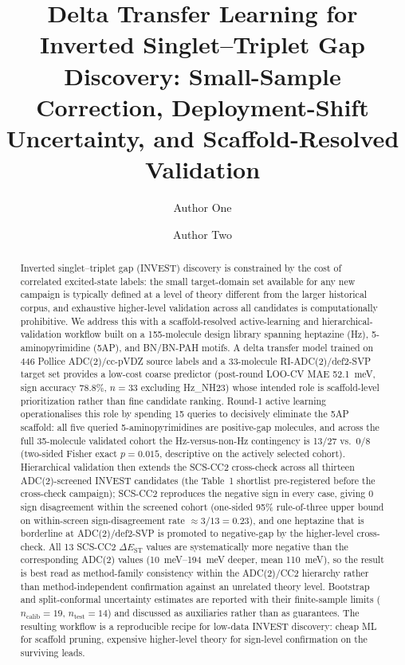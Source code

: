 \documentclass[journal=jcisd8,manuscript=article]{achemso}
\title{Delta Transfer Learning for Inverted Singlet--Triplet Gap Discovery: Small-Sample Correction, Deployment-Shift Uncertainty, and Scaffold-Resolved Validation}
\author{Author One}
\affiliation{School of Chemistry, Example University, City 000000, China}
\author{Author Two}
\affiliation{School of Chemistry, Example University, City 000000, China}
\begin{document}
\begin{abstract}
Inverted singlet--triplet gap (INVEST) discovery is constrained by the cost of correlated excited-state labels: the small target-domain set available for any new campaign is typically defined at a level of theory different from the larger historical corpus, and exhaustive higher-level validation across all candidates is computationally prohibitive. We address this with a scaffold-resolved active-learning and hierarchical-validation workflow built on a 155-molecule design library spanning heptazine (Hz), 5-aminopyrimidine (5AP), and BN/BN-PAH motifs. A delta transfer model trained on 446 Pollice ADC(2)/cc-pVDZ source labels and a 33-molecule RI-ADC(2)/def2-SVP target set provides a low-cost coarse predictor (post-round LOO-CV MAE \SI{52.1}{meV}, sign accuracy 78.8\%, $n=33$ excluding Hz\_NH23) whose intended role is scaffold-level prioritization rather than fine candidate ranking. Round-1 active learning operationalises this role by spending 15 queries to decisively eliminate the 5AP scaffold: all five queried 5-aminopyrimidines are positive-gap molecules, and across the full 35-molecule validated cohort the Hz-versus-non-Hz contingency is 13/27 vs.\ 0/8 (two-sided Fisher exact $p=0.015$, descriptive on the actively selected cohort). Hierarchical validation then extends the SCS-CC2 cross-check across all thirteen ADC(2)-screened INVEST candidates (the Table~1 shortlist pre-registered before the cross-check campaign); SCS-CC2 reproduces the negative sign in every case, giving 0 sign disagreement within the screened cohort (one-sided 95\% rule-of-three upper bound on within-screen sign-disagreement rate $\approx 3/13 = 0.23$), and one heptazine that is borderline at ADC(2)/def2-SVP is promoted to negative-gap by the higher-level cross-check. All 13 SCS-CC2 $\Delta E_\mathrm{ST}$ values are systematically more negative than the corresponding ADC(2) values (\SIrange{10}{194}{meV} deeper, mean \SI{110}{meV}), so the result is best read as method-family consistency within the ADC(2)/CC2 hierarchy rather than method-independent confirmation against an unrelated theory level. Bootstrap and split-conformal uncertainty estimates are reported with their finite-sample limits ($n_\text{calib}=19$, $n_\text{test}=14$) and discussed as auxiliaries rather than as guarantees. The resulting workflow is a reproducible recipe for low-data INVEST discovery: cheap ML for scaffold pruning, expensive higher-level theory for sign-level confirmation on the surviving leads.
\end{abstract}
\end{document}
